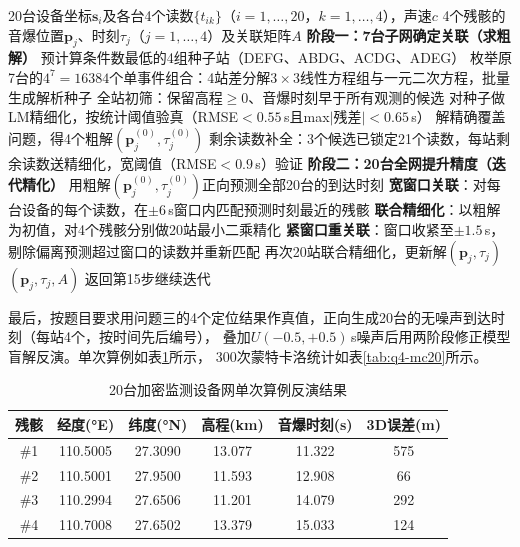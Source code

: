 \documentclass[draft,12pt,a4paper]{ctexart}
\theoremstyle{definition}
\begin{document}
\begin{algorithm}[H]
\caption{问题四两阶段求解流程}\label{alg:q4}
\begin{algorithmic}[1]
\Require 20台设备坐标$\mathbf{s}_i$及各台4个读数$\{t_{ik}\}$（$i=1,\dots,20$，$k=1,\dots,4$），声速$c$
\Ensure 4个残骸的音爆位置$\mathbf{p}_j$、时刻$\tau_j$（$j=1,\dots,4$）及关联矩阵$A$
\Statex \textbf{阶段一：7台子网确定关联（求粗解）}
\State 预计算条件数最低的4组种子站（DEFG、ABDG、ACDG、ADEG）
\State 枚举原7台的$4^7=16384$个单事件组合：4站差分解$3\times3$线性方程组与一元二次方程，批量生成解析种子
\State 全站初筛：保留高程$\ge0$、音爆时刻早于所有观测的候选
\State 对种子做LM精细化，按统计阈值验真（RMSE$<0.55$\,s且max$|$残差$|<0.65$\,s）
  \State 解精确覆盖问题，得4个粗解$(\mathbf{p}_j^{(0)},\tau_j^{(0)})$
 
  \State 剩余读数补全：3个候选已锁定21个读数，每站剩余读数送精细化，宽阈值（RMSE$<0.9$\,s）验证
\EndIf
\Statex \textbf{阶段二：20台全网提升精度（迭代精化）}
\State 用粗解$(\mathbf{p}_j^{(0)},\tau_j^{(0)})$正向预测全部20台的到达时刻
\State \textbf{宽窗口关联}：对每台设备的每个读数，在$\pm6$\,s窗口内匹配预测时刻最近的残骸
\State \textbf{联合精细化}：以粗解为初值，对4个残骸分别做20站最小二乘精化
\State \textbf{紧窗口重关联}：窗口收紧至$\pm1.5$\,s，剔除偏离预测超过窗口的读数并重新匹配
\State 再次20站联合精细化，更新解$(\mathbf{p}_j,\tau_j)$
  \State \Return $(\mathbf{p}_j,\tau_j,A)$
\Else
  \State 返回第15步继续迭代
\EndIf
\end{algorithmic}
\end{algorithm}

最后，按题目要求用问题三的4个定位结果作真值，正向生成20台的无噪声到达时刻（每站4个，按时间先后编号），
叠加$U(-0.5,+0.5)$\,s噪声后用两阶段修正模型盲解反演。单次算例如表\ref{tab:q4-single20}所示，
300次蒙特卡洛统计如表\ref{tab:q4-mc20}所示。

\begin{table}[H]\centering
  \caption{20台加密监测设备网单次算例反演结果}\label{tab:q4-single20}
  \small
  \begin{tabular}{cccccc}
    \toprule
    \textbf{残骸} & \textbf{经度(°E)} & \textbf{纬度(°N)} & \textbf{高程(km)} & \textbf{音爆时刻(s)} & \textbf{3D误差(m)} \\
    \midrule
    \#1 & 110.5005 & 27.3090 & 13.077 & 11.322 & 575 \\
    \#2 & 110.5001 & 27.9500 & 11.593 & 12.908 & 66 \\
    \#3 & 110.2994 & 27.6506 & 11.201 & 14.079 & 292 \\
    \#4 & 110.7008 & 27.6502 & 13.379 & 15.033 & 124 \\
    \bottomrule
  \end{tabular}
\end{table}
\end{document}
